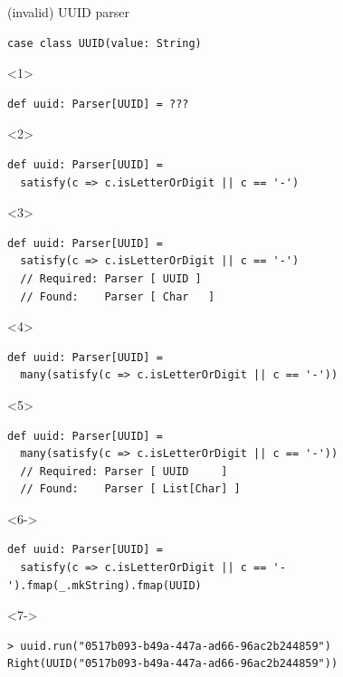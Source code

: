 \documentclass[presentation,aspectratio=169,smaller]{beamer}
\begin{document}
\begin{frame}[label={sec:org31c21ab},fragile,t]{(invalid) UUID parser}
 \begin{verbatim}
case class UUID(value: String)
\end{verbatim}

\begin{onlyenv}<1>
\begin{verbatim}
def uuid: Parser[UUID] = ???
\end{verbatim}
\end{onlyenv}

\begin{onlyenv}<2>
\begin{verbatim}
def uuid: Parser[UUID] =
  satisfy(c => c.isLetterOrDigit || c == '-')
\end{verbatim}
\end{onlyenv}

\begin{onlyenv}<3>
\begin{verbatim}
def uuid: Parser[UUID] =
  satisfy(c => c.isLetterOrDigit || c == '-')
  // Required: Parser [ UUID ]
  // Found:    Parser [ Char   ]
\end{verbatim}
\end{onlyenv}

\begin{onlyenv}<4>
\begin{verbatim}
def uuid: Parser[UUID] =
  many(satisfy(c => c.isLetterOrDigit || c == '-'))
\end{verbatim}
\end{onlyenv}

\begin{onlyenv}<5>
\begin{verbatim}
def uuid: Parser[UUID] =
  many(satisfy(c => c.isLetterOrDigit || c == '-'))
  // Required: Parser [ UUID     ]
  // Found:    Parser [ List[Char] ]
\end{verbatim}
\end{onlyenv}

\begin{onlyenv}<6->
\begin{verbatim}
def uuid: Parser[UUID] =
  satisfy(c => c.isLetterOrDigit || c == '-').fmap(_.mkString).fmap(UUID)
\end{verbatim}
\end{onlyenv}

\begin{onlyenv}<7->
\begin{verbatim}
> uuid.run("0517b093-b49a-447a-ad66-96ac2b244859")
Right(UUID("0517b093-b49a-447a-ad66-96ac2b244859"))
\end{verbatim}
\end{onlyenv}


\end{frame}
\end{document}
